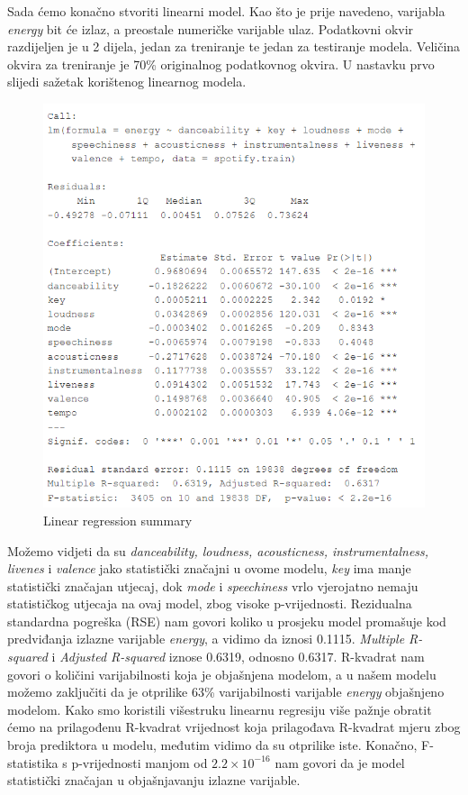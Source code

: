 	Sada ćemo konačno stvoriti linearni model. Kao što je prije navedeno, varijabla \textit{energy} bit će izlaz, a preostale numeričke varijable ulaz.
	Podatkovni okvir razdijeljen je u 2 dijela, jedan za treniranje te jedan za testiranje modela. Veličina okvira za treniranje je 70\% originalnog podatkovnog okvira. 
	U nastavku prvo slijedi sažetak korištenog linearnog modela.
	
	\begin{figure}[H]
		\includegraphics[scale=0.9]{slike/linReg.png}
		\centering
		\caption{Linear regression summary}
		
	\end{figure}
	
	Možemo vidjeti da su \textit{danceability, loudness, acousticness, instrumentalness, livenes} i \textit{valence} jako statistički značajni u ovome modelu, \textit{key} ima manje statistički značajan utjecaj, dok \textit{mode} i \textit{speechiness} vrlo vjerojatno nemaju statističkog utjecaja na ovaj model, zbog visoke p-vrijednosti.
	Rezidualna standardna pogreška (RSE) nam govori koliko u prosjeku model promašuje kod predviđanja izlazne varijable \textit{energy}, a vidimo da iznosi 0.1115.
	\textit{Multiple R-squared} i \textit{Adjusted R-squared} iznose 0.6319, odnosno 0.6317. R-kvadrat nam govori o količini varijabilnosti koja je objašnjena modelom, a u našem modelu možemo zaključiti da je otprilike 63\% varijabilnosti varijable \textit{energy} objašnjeno modelom. Kako smo koristili višestruku linearnu regresiju više pažnje obratit ćemo na prilagođenu R-kvadrat vrijednost koja prilagođava R-kvadrat mjeru zbog broja prediktora u modelu, međutim vidimo da su otprilike iste.
	Konačno, F-statistika s p-vrijednosti manjom od \(2.2 \times 10^{-16}\) nam govori da je model statistički značajan u objašnjavanju izlazne varijable.
	
